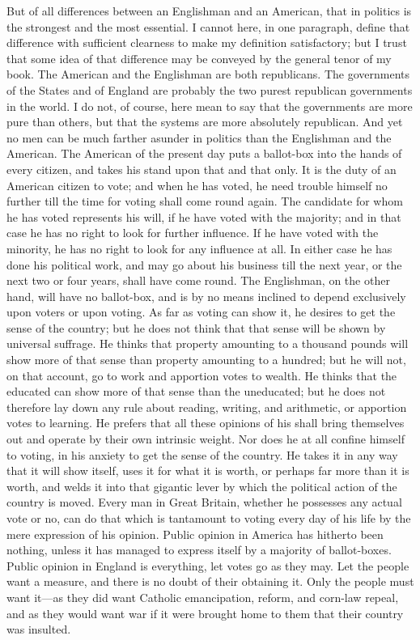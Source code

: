 But of all differences between an Englishman and an American, that
in politics is the strongest and the most essential.  I cannot
here, in one paragraph, define that difference with sufficient
clearness to make my definition satisfactory; but I trust that some
idea of that difference may be conveyed by the general tenor of my
book.  The American and the Englishman are both republicans.  The
governments of the States and of England are probably the two
purest republican governments in the world.  I do not, of course,
here mean to say that the governments are more pure than others,
but that the systems are more absolutely republican.  And yet no
men can be much farther asunder in politics than the Englishman and
the American.  The American of the present day puts a ballot-box
into the hands of every citizen, and takes his stand upon that and
that only.  It is the duty of an American citizen to vote; and when
he has voted, he need trouble himself no further till the time for
voting shall come round again.  The candidate for whom he has voted
represents his will, if he have voted with the majority; and in
that case he has no right to look for further influence.  If he
have voted with the minority, he has no right to look for any
influence at all.  In either case he has done his political work,
and may go about his business till the next year, or the next two
or four years, shall have come round.  The Englishman, on the other
hand, will have no ballot-box, and is by no means inclined to
depend exclusively upon voters or upon voting.  As far as voting
can show it, he desires to get the sense of the country; but he
does not think that that sense will be shown by universal suffrage.
He thinks that property amounting to a thousand pounds will show
more of that sense than property amounting to a hundred; but he
will not, on that account, go to work and apportion votes to
wealth.  He thinks that the educated can show more of that sense
than the uneducated; but he does not therefore lay down any rule
about reading, writing, and arithmetic, or apportion votes to
learning.  He prefers that all these opinions of his shall bring
themselves out and operate by their own intrinsic weight.  Nor does
he at all confine himself to voting, in his anxiety to get the
sense of the country.  He takes it in any way that it will show
itself, uses it for what it is worth, or perhaps far more than it
is worth, and welds it into that gigantic lever by which the
political action of the country is moved.  Every man in Great
Britain, whether he possesses any actual vote or no, can do that
which is tantamount to voting every day of his life by the mere
expression of his opinion.  Public opinion in America has hitherto
been nothing, unless it has managed to express itself by a majority
of ballot-boxes.  Public opinion in England is everything, let
votes go as they may.  Let the people want a measure, and there is
no doubt of their obtaining it.  Only the people must want it---as
they did want Catholic emancipation, reform, and corn-law repeal,
and as they would want war if it were brought home to them that
their country was insulted.

